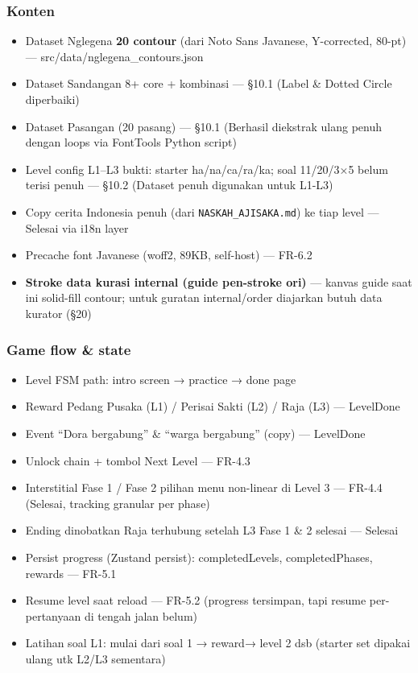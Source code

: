 \documentclass[
  11pt,
]{article}
\providecommand{\tightlist}{%
  \setlength{\itemsep}{0pt}\setlength{\parskip}{0pt}}
\begin{document}
\subsubsection{Konten}\label{konten}

\begin{itemize}
\tightlist
\item[$\boxtimes$]
  Dataset Nglegena \textbf{20 contour} (dari Noto Sans Javanese,
  Y-corrected, 80-pt) --- src/data/nglegena\_contours.json
\item[$\boxtimes$]
  Dataset Sandangan 8+ core + kombinasi --- §10.1 (Label \& Dotted
  Circle diperbaiki)
\item[$\boxtimes$]
  Dataset Pasangan (20 pasang) --- §10.1 (Berhasil diekstrak ulang penuh
  dengan loops via FontTools Python script)
\item[$\boxtimes$]
  Level config L1--L3 bukti: starter ha/na/ca/ra/ka; soal 11/20/3×5
  belum terisi penuh --- §10.2 (Dataset penuh digunakan untuk L1-L3)
\item[$\boxtimes$]
  Copy cerita Indonesia penuh (dari \texttt{NASKAH\_AJISAKA.md}) ke tiap
  level --- Selesai via i18n layer
\item[$\boxtimes$]
  Precache font Javanese (woff2, 89KB, self-host) --- FR-6.2
\item[$\square$]
  \textbf{Stroke data kurasi internal (guide pen-stroke ori)} --- kanvas
  guide saat ini solid-fill contour; untuk guratan internal/order
  diajarkan butuh data kurator (§20)
\end{itemize}

\subsubsection{Game flow \& state}\label{game-flow-state}

\begin{itemize}
\tightlist
\item[$\boxtimes$]
  Level FSM path: intro screen → practice → done page
\item[$\boxtimes$]
  Reward Pedang Pusaka (L1) / Perisai Sakti (L2) / Raja (L3) ---
  LevelDone
\item[$\boxtimes$]
  Event ``Dora bergabung'' \& ``warga bergabung'' (copy) --- LevelDone
\item[$\boxtimes$]
  Unlock chain + tombol Next Level --- FR-4.3
\item[$\boxtimes$]
  Interstitial Fase 1 / Fase 2 pilihan menu non-linear di Level 3 ---
  FR-4.4 (Selesai, tracking granular per phase)
\item[$\boxtimes$]
  Ending dinobatkan Raja terhubung setelah L3 Fase 1 \& 2 selesai ---
  Selesai
\item[$\boxtimes$]
  Persist progress (Zustand persist): completedLevels, completedPhases,
  rewards --- FR-5.1
\item[$\square$]
  Resume level saat reload --- FR-5.2 (progress tersimpan, tapi resume
  per-pertanyaan di tengah jalan belum)
\item[$\square$]
  Latihan soal L1: mulai dari soal 1 → reward→ level 2 dsb (starter set
  dipakai ulang utk L2/L3 sementara)
\end{itemize}
\end{document}
